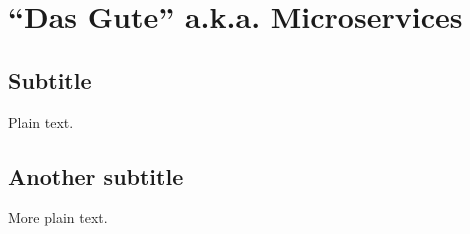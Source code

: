 \section{"`Das Gute"' a.k.a. Microservices}

\subsection{Subtitle}

Plain text.

\subsection{Another subtitle}

More plain text.
